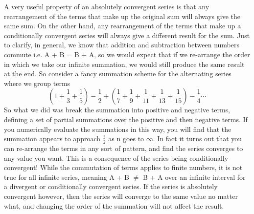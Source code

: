 \documentclass{article}
\newcommand{\be}{\begin{equation}}
\newcommand{\ee}{\end{equation}}
\begin{document}
A very useful property of an absolutely convergent series is that any rearrangement of the terms that make up the original sum will always give the same sum.
On the other hand, any rearrangement of the terms that make up a conditionally convergent series will always give a different result for the sum.
Just to clarify, in general, we know that addition and subtraction between numbers commute i.e. A + B = B + A, so we would expect that if we re-arrange the order in which we take our infinite summation, we would still produce the same result at the end.
So consider a fancy summation scheme for the alternating series where we group terms
\be
\left(1 + \frac{1}{3} + \frac{1}{5}\right) - \frac{1}{2} + \left(\frac{1}{7} + \frac{1}{9} + \frac{1}{11} + \frac{1}{13} + \frac{1}{15}\right) - \frac{1}{4} \cdots
\ee
So what we did was break the summation into positive and negative terms, defining a set of partial summations over the positive and then negative terms.
If you numerically evaluate the summations in this way, you will find that the summation appears to approach $\frac{3}{2}$ as n goes to $\infty$.
In fact it turns out that you can re-arrange the terms in any sort of pattern, and find the series converges to any value you want.
This is a consequence of the series being conditionally convergent!
While the commutation of terms applies to finite numbers, it is not true for all infinite series, meaning A + B $\neq$ B + A over an infinite interval for a divergent or conditionally convergent series.
If the series is absolutely convergent however, then the series will converge to the same value no matter what, and changing the order of the summation will not affect the result.
\end{document}
